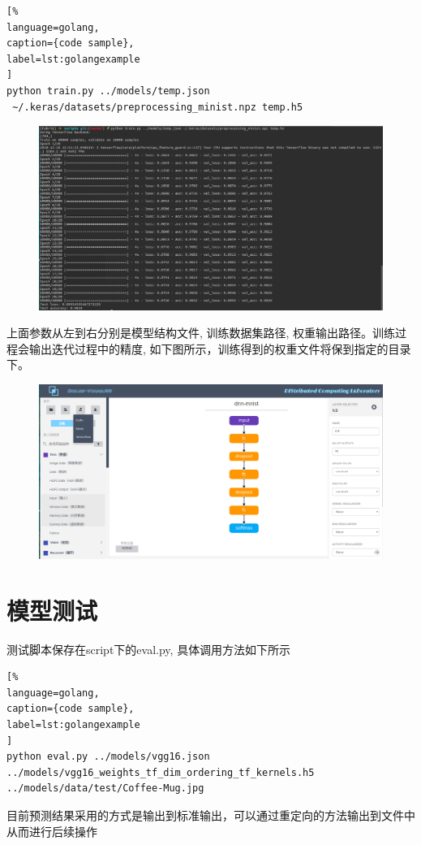 \documentclass{progbookcn}
\begin{document}
\begin{lstlisting}[%
language=golang,
caption={code sample},
label=lst:golangexample
]
python train.py ../models/temp.json
 ~/.keras/datasets/preprocessing_minist.npz temp.h5
\end{lstlisting}

\begin{figure}[H]
  \centering
  \includegraphics[width=0.98\linewidth]{example_train.png}
\end{figure}

上面参数从左到右分别是模型结构文件, 训练数据集路径, 权重输出路径。训练过程会输出迭代过程中的精度, 如下图所示，训练得到的权重文件将保到指定的目录下。

\begin{figure}[H]
  \centering
  \includegraphics[width=0.98\linewidth]{example_export.png}
\end{figure}

\section{模型测试}

测试脚本保存在script下的eval.py, 具体调用方法如下所示

\begin{lstlisting}[%
language=golang,
caption={code sample},
label=lst:golangexample
]
python eval.py ../models/vgg16.json
../models/vgg16_weights_tf_dim_ordering_tf_kernels.h5 
../models/data/test/Coffee-Mug.jpg
\end{lstlisting}

目前预测结果采用的方式是输出到标准输出，可以通过重定向的方法输出到文件中从而进行后续操作







\end{document}
